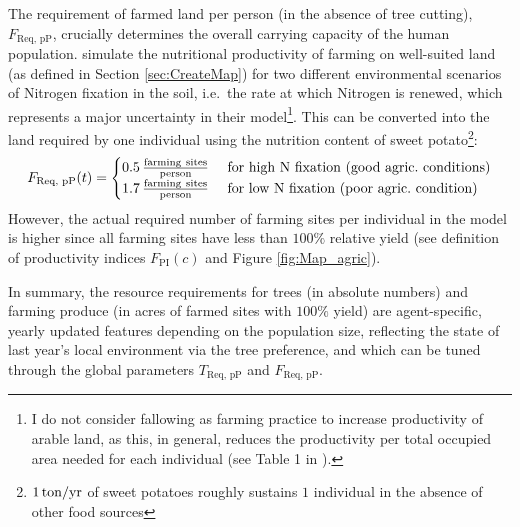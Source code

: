 The requirement of farmed land per person (in the absence of tree cutting), $F_\text{Req, pP}$, crucially determines the overall carrying capacity of the human population.
\citet{Puleston2017} simulate the nutritional productivity of farming on well-suited land (as defined in Section \ref{sec:CreateMap}) for two different environmental scenarios of Nitrogen fixation in the soil, i.e.\ the rate at which Nitrogen is renewed, which represents a major uncertainty in their model\footnote{I do not consider fallowing as farming practice to increase productivity of arable land, as this, in general, reduces the productivity per total occupied area needed for each individual (see Table 1 in ).}.
This can be converted into the land required by one individual using the nutrition content of sweet potato\footnote{$1\, \rm{ton/yr}$ of sweet potatoes roughly sustains $1$ individual in the absence of other food sources}: 
\begin{equation}
F_\text{Req, pP}(t) = \begin{cases}
	0.5 \, {\rm \frac{farming\ sites}{person} } & \text{ for high N fixation (good agric.\ conditions)} \\
	1.7 \, {\rm \frac{farming\ sites}{person} } & \text{ for low N fixation (poor agric.\ condition)} \\
 \end{cases}
\end{equation}
However, the actual required number of farming sites per individual in the model is higher since all farming sites have less than $100\%$ relative yield (see definition of productivity indices $F_\text{PI}(c)$ and Figure \ref{fig:Map_agric}).

In summary, the resource requirements for trees (in absolute numbers) and farming produce (in acres of farmed sites with $100\%$ yield) are agent-specific, yearly updated features depending on the population size, reflecting the state of last year's local environment via the tree preference, and which can be tuned through the global parameters $T_\text{Req, pP}$ and $F_\text{Req, pP}$.

